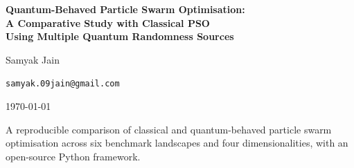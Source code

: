 \documentclass[11pt,a4paper]{article}
\begin{document}
\begin{titlepage}
    \centering
    \vspace*{3cm}
    {\LARGE\bfseries
        Quantum-Behaved Particle Swarm Optimisation:\\[6pt]
        A Comparative Study with Classical PSO\\[6pt]
        Using Multiple Quantum Randomness Sources
    \par}
    \vspace{2cm}
    {\Large Samyak Jain\par}
    \vspace{0.6cm}
    {\normalsize\texttt{samyak.09jain@gmail.com}\par}
    \vspace{1.5cm}
    {\large \today\par}
    \vfill
    {\normalsize
        A reproducible comparison of classical and quantum-behaved particle
        swarm optimisation across six benchmark landscapes and four
        dimensionalities, with an open-source Python framework.
    \par}
    \vspace{2cm}
\end{titlepage}

\begin{abstract}
    
\end{abstract}

\newpage
\tableofcontents
\newpage








\newpage
\printbibliography[heading=bibintoc]

\newpage
\begin{appendices}
    
\end{appendices}
\end{document}
